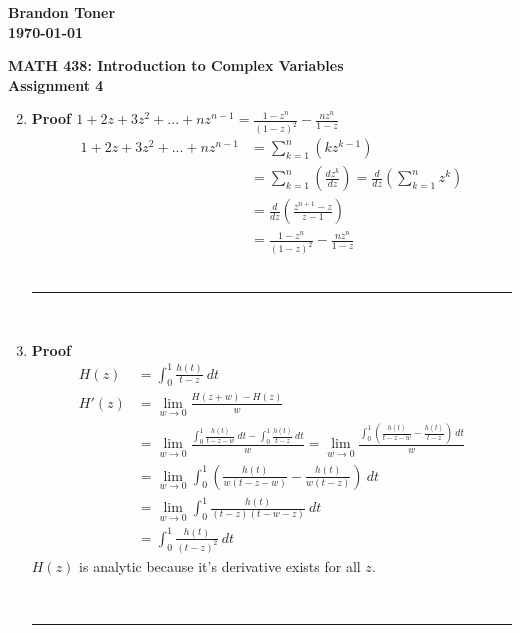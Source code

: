 \documentclass{article}%
\newenvironment{proof}[1][]{\begin{samepage}\textbf{Proof #1} \\ }{\\ \rule{0.5em}{0.5em} \end{samepage} \\}
\begin{document}
\begin{flushright}
\textbf{Brandon Toner \\
\today}
\end{flushright}

\begin{center}
\textbf{MATH 438: Introduction to Complex Variables \\
Assignment 4} \\
\end{center}

\begin{enumerate}
    \setcounter{enumi}{1}
    \item %
    \begin{proof}[$1 + 2z + 3z^2 + ... + n z^{n - 1} = \frac{1-z^n}{(1-z)^2} - \frac{n z^n}{1-z}$]
        \begin{align*}
            1 + 2z + 3z^2 + ... + n z^{n - 1} &= \sum\limits_{k=1}^n \left(k z^{k-1}\right) \\
                                              &= \sum\limits_{k=1}^n \left( \frac{d z^k}{dz} \right) = \frac{d}{dz} \left( \sum\limits_{k=1}^n z^k \right) \\
                                              &= \frac{d}{dz} \left(\frac{z^{n+1}-z}{z-1}\right) \\
                                              &= \frac{1-z^n}{(1-z)^2} - \frac{n z^n}{1-z}
        \end{align*}
    \end{proof}
    \setcounter{enumi}{5}
    \item %
    \begin{proof}
        \begin{align*}
            H(z) &= \int_{0}^{1}\frac{h(t)}{t-z}\ dt\\
            H'(z) &= \lim_{w \to 0} \frac{H(z+w) - H(z)}{w} \\
                  &= \lim_{w \to 0} \frac{\int_{0}^{1}\frac{h(t)}{t-z-w}\ dt - \int_{0}^{1}\frac{h(t)}{t-z}\ dt}{w} = \lim_{w \to 0} \frac{\int_{0}^{1}\left(\frac{h(t)}{t-z-w} - \frac{h(t)}{t-z}\right)\ dt}{w} \\
                  &= \lim_{w \to 0} \int_{0}^{1}\left(\frac{h(t)}{w(t-z-w)} - \frac{h(t)}{w(t-z)}\right)\ dt \\
                  &= \lim_{w \to 0} \int_{0}^{1}\frac{h(t)}{(t-z)(t-w-z)}\ dt \\
                  &=  \int_{0}^{1}\frac{h(t)}{(t-z)^2}\ dt
        \end{align*}
        $H(z)$ is analytic because it's derivative exists for all $z$.

\end{proof}
\end{enumerate}
\end{document}
